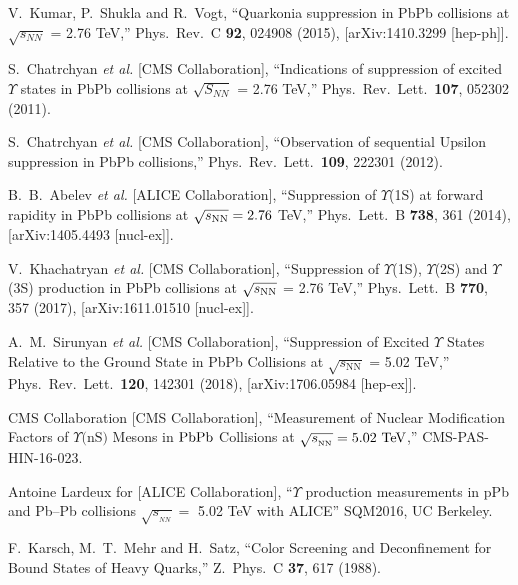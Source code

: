 \documentclass[12pt,a4paper,final]{iopart} %
\newcommand{\sNN}{\sqrt{s_{_{NN}}}}
\begin{document}
\begin{thebibliography}{100}
  V.~Kumar, P.~Shukla and R.~Vogt,
  ``Quarkonia suppression in PbPb collisions at $\sqrt{s_{NN}}$ = 2.76 TeV,''
  Phys.\ Rev.\ C {\bf 92}, 024908 (2015),
  [arXiv:1410.3299 [hep-ph]].



  S.~Chatrchyan {\it et al.}  [CMS Collaboration],
  ``Indications of suppression of excited $\Upsilon$ states in PbPb collisions at $\sqrt{S_{NN}}$ = 2.76 TeV,''
 Phys.\ Rev.\ Lett.\  {\bf 107}, 052302 (2011).

  S.~Chatrchyan {\it et al.}  [CMS Collaboration],
  ``Observation of sequential Upsilon suppression in PbPb collisions,''
  Phys.\ Rev.\ Lett.\  {\bf 109}, 222301 (2012).

  B.~B.~Abelev {\it et al.} [ALICE Collaboration],
  ``Suppression of $\Upsilon$(1S) at forward rapidity in PbPb collisions at $\sqrt{s_{\rm NN}} = 2.76$ TeV,''
  Phys.\ Lett.\ B {\bf 738}, 361 (2014), [arXiv:1405.4493 [nucl-ex]].
  
  
  V.~Khachatryan {\it et al.} [CMS Collaboration],
  ``Suppression of $\Upsilon$(1S), $\Upsilon$(2S) and $\Upsilon$(3S) production in PbPb collisions at $\sqrt{s_{\rm NN}}$ = 2.76 TeV,''
  Phys.\ Lett.\ B {\bf 770}, 357 (2017), [arXiv:1611.01510 [nucl-ex]].


  A.~M.~Sirunyan {\it et al.} [CMS Collaboration],
  ``Suppression of Excited $\Upsilon$ States Relative to the Ground State in PbPb Collisions at $\sqrt{s_\mathrm{NN}}$ = 5.02 TeV,''
  Phys.\ Rev.\ Lett.\  {\bf 120}, 142301 (2018), [arXiv:1706.05984 [hep-ex]].
  


  CMS Collaboration [CMS Collaboration],
  ``Measurement of Nuclear Modification Factors of $\Upsilon\textrm{(nS)}$ Mesons in ${\rm PbPb}$ Collisions 
  at $\sqrt{s_{_{{\rm NN}}}} = 5.02~\mathrm{TeV}$,''  CMS-PAS-HIN-16-023.


  Antoine Lardeux for [ALICE Collaboration],
   ``$\Upsilon$ production measurements in pPb and Pb–Pb collisions $\sNN =$ 5.02 TeV with ALICE'' SQM2016, UC Berkeley.
 
  F.~Karsch, M.~T.~Mehr and H.~Satz,
  ``Color Screening and Deconfinement for Bound States of Heavy Quarks,''
  Z.\ Phys.\ C {\bf 37}, 617 (1988).


\end{thebibliography}
\end{document}
